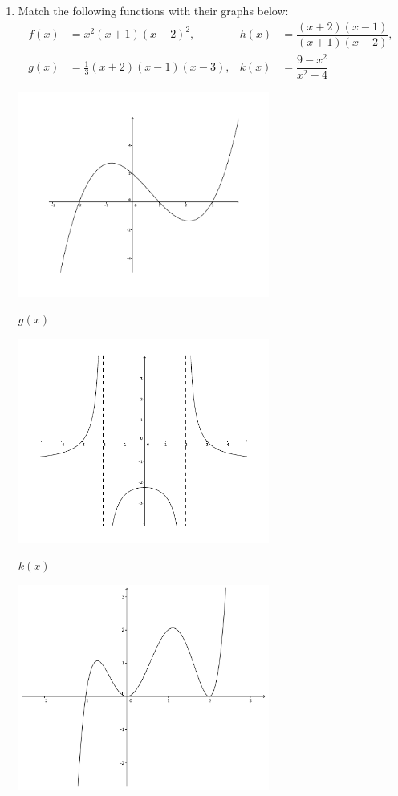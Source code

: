 \documentclass[12pt]{article}
\newcommand{\points}[1]{\marginpar{\hspace{24pt}[#1]}}
\begin{document}
\begin{enumerate}
\item Match the following functions with their graphs below: \points{8}
\begin{align*}
 f(x) &= x^2(x+1)(x-2)^2, &h(x) &= \dfrac{(x+2)(x-1)}{(x+1)(x-2)},\\
 g(x) &= \frac{1}{3}(x+2)(x-1)(x-3), &k(x) &= \dfrac{9-x^2}{x^2-4}
\end{align*}

\bigskip

\begin{multicols}{2}
 \begin{center}
  \includegraphics[width=3.25in]{poly1(b)}

$g(x)$
 \end{center}

\bigskip

\bigskip

 \begin{center}
   \includegraphics[width=3.25in]{rat1(d)}

$k(x)$
 \end{center}
 \begin{center}
   \includegraphics[width=3.25in]{poly1(d)}


\end{center}
\end{multicols}
\end{enumerate}
\end{document}
